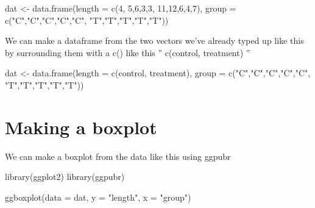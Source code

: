 \documentclass[
]{book}
\newenvironment{Shaded}{\begin{snugshade}}{\end{snugshade}}
\newcommand{\AttributeTok}[1]{\textcolor[rgb]{0.77,0.63,0.00}{#1}}
\newcommand{\DecValTok}[1]{\textcolor[rgb]{0.00,0.00,0.81}{#1}}
\newcommand{\FunctionTok}[1]{\textcolor[rgb]{0.00,0.00,0.00}{#1}}
\newcommand{\NormalTok}[1]{#1}
\newcommand{\OtherTok}[1]{\textcolor[rgb]{0.56,0.35,0.01}{#1}}
\newcommand{\StringTok}[1]{\textcolor[rgb]{0.31,0.60,0.02}{#1}}
\begin{document}
\begin{Shaded}
\begin{Highlighting}[]
\NormalTok{dat }\OtherTok{\textless{}{-}} \FunctionTok{data.frame}\NormalTok{(}\AttributeTok{length =} \FunctionTok{c}\NormalTok{(}\DecValTok{4}\NormalTok{,  }\DecValTok{5}\NormalTok{,}\DecValTok{6}\NormalTok{,}\DecValTok{3}\NormalTok{,}\DecValTok{3}\NormalTok{,}
                             \DecValTok{11}\NormalTok{,}\DecValTok{12}\NormalTok{,}\DecValTok{6}\NormalTok{,}\DecValTok{4}\NormalTok{,}\DecValTok{7}\NormalTok{),}
                  \AttributeTok{group =} \FunctionTok{c}\NormalTok{(}\StringTok{"C"}\NormalTok{,}\StringTok{"C"}\NormalTok{,}\StringTok{"C"}\NormalTok{,}\StringTok{"C"}\NormalTok{,}\StringTok{"C"}\NormalTok{,}
                            \StringTok{"T"}\NormalTok{,}\StringTok{"T"}\NormalTok{,}\StringTok{"T"}\NormalTok{,}\StringTok{"T"}\NormalTok{,}\StringTok{"T"}\NormalTok{))}
\end{Highlighting}
\end{Shaded}

We can make a dataframe from the two vectors we've already typed up like this by surrounding them with a c() like this '' c(control, treatment) ''

\begin{Shaded}
\begin{Highlighting}[]
\NormalTok{dat }\OtherTok{\textless{}{-}} \FunctionTok{data.frame}\NormalTok{(}\AttributeTok{length =} \FunctionTok{c}\NormalTok{(control, }
\NormalTok{                             treatment),}
                  \AttributeTok{group =} \FunctionTok{c}\NormalTok{(}\StringTok{"C"}\NormalTok{,}\StringTok{"C"}\NormalTok{,}\StringTok{"C"}\NormalTok{,}\StringTok{"C"}\NormalTok{,}\StringTok{"C"}\NormalTok{,}
                            \StringTok{"T"}\NormalTok{,}\StringTok{"T"}\NormalTok{,}\StringTok{"T"}\NormalTok{,}\StringTok{"T"}\NormalTok{,}\StringTok{"T"}\NormalTok{))}
\end{Highlighting}
\end{Shaded}

\hypertarget{making-a-boxplot-1}{%
\section{Making a boxplot}\label{making-a-boxplot-1}}

We can make a boxplot from the data like this using ggpubr

\begin{Shaded}
\begin{Highlighting}[]
\FunctionTok{library}\NormalTok{(ggplot2)}
\FunctionTok{library}\NormalTok{(ggpubr)}

\FunctionTok{ggboxplot}\NormalTok{(}\AttributeTok{data =}\NormalTok{ dat,}
          \AttributeTok{y =} \StringTok{"length"}\NormalTok{,}
          \AttributeTok{x =} \StringTok{"group"}\NormalTok{)}
\end{Highlighting}
\end{Shaded}
\end{document}
